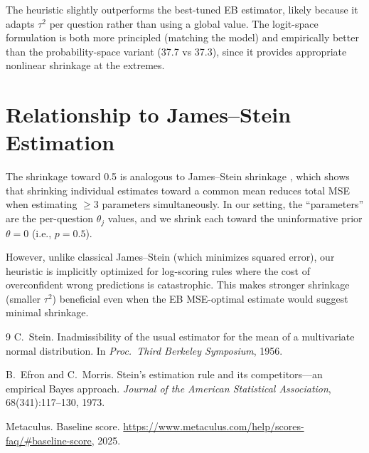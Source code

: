 \documentclass[11pt]{article}
\begin{document}
The heuristic slightly outperforms the best-tuned EB estimator, likely because
it adapts $\tau^2$ per question rather than using a global value.
The logit-space formulation is both more principled (matching the model) and
empirically better than the probability-space variant (37.7 vs 37.3),
since it provides appropriate nonlinear shrinkage at the extremes.

\section{Relationship to James--Stein Estimation}

The shrinkage toward 0.5 is analogous to James--Stein shrinkage
\cite{stein1956,efron1973}, which shows that shrinking individual estimates
toward a common mean reduces total MSE when estimating $\geq 3$ parameters
simultaneously.  In our setting, the ``parameters'' are the per-question
$\theta_j$ values, and we shrink each toward the uninformative prior
$\theta = 0$ (i.e., $p = 0.5$).

However, unlike classical James--Stein (which minimizes squared error), our
heuristic is implicitly optimized for log-scoring rules where the cost of
overconfident wrong predictions is catastrophic.  This makes stronger
shrinkage (smaller $\tau^2$) beneficial even when the EB MSE-optimal
estimate would suggest minimal shrinkage.

\begin{thebibliography}{9}
C.~Stein.
\newblock Inadmissibility of the usual estimator for the mean of a
  multivariate normal distribution.
\newblock In \emph{Proc.\ Third Berkeley Symposium}, 1956.

B.~Efron and C.~Morris.
\newblock Stein's estimation rule and its competitors---an empirical Bayes
  approach.
\newblock \emph{Journal of the American Statistical Association},
  68(341):117--130, 1973.

Metaculus.
\newblock Baseline score.
\newblock \url{https://www.metaculus.com/help/scores-faq/#baseline-score}, 2025.
\end{thebibliography}
\end{document}
